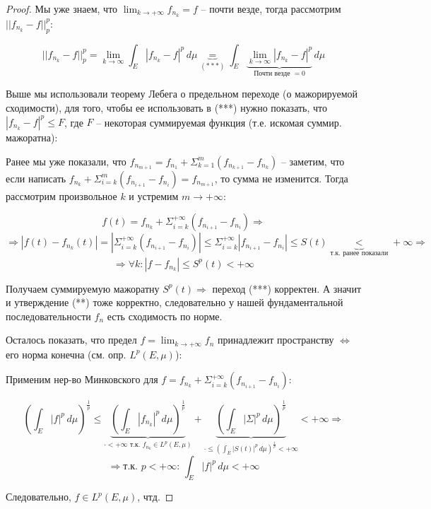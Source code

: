 \begin{proof}
    Мы уже знаем, что $\lim_{k\rightarrow +\infty} f_{n_k} = f$ -- почти везде, тогда рассмотрим $|| f_{n_k} - f ||^p_p$:

    $$|| f_{n_k} - f ||^p_p = \lim_{k\rightarrow \infty} \int_{E} |f_{n_k} - f|^p \,d\mu \underbrace{=}_{(***)} \int_{E} \underbrace{\lim_{k\rightarrow \infty} |f_{n_k}-f|^p}_{\text{Почти везде $= 0$}}\, d\mu$$

    Выше мы использовали теорему Лебега о предельном переходе (о мажорируемой сходимости), для того, чтобы ее использовать в (***) нужно показать, что $|f_{n_k} - f|^p \leq F$, где $F$ -- некоторая суммируемая функция (т.е. искомая суммир. мажоратна):

    Ранее мы уже показали, что $f_{n_{m+1}} = f_{n_1} + \Sigma_{k=1}^{m} (f_{n_{k+1}} - f_{n_k})$ -- заметим, что если написать $f_{n_k} + \Sigma_{i=k}^{m} (f_{n_{i+1}} - f_{n_i}) = f_{n_{m+1}}$, то сумма не изменится. Тогда рассмотрим произвольное $k$ и устремим $m \rightarrow +\infty$:

    $$ f(t) = f_{n_k} + \Sigma_{i=k}^{+\infty} (f_{n_{i+1}} - f_{n_i}) \Rightarrow $$
    $$ \Rightarrow |f(t) - f_{n_k}(t)| = \left|\Sigma_{i=k}^{+\infty} (f_{n_{i+1}} - f_{n_i})\right| \leq \Sigma_{i=k}^{+\infty} |f_{n_{i+1}} - f_{n_i}| \leq S(t) \underbrace{<}_{\text{т.к. ранее показали}} +\infty \Rightarrow$$
    $$ \Rightarrow \forall k: |f - f_{n_k}| \leq S^p(t) < +\infty $$

    Получаем суммируемую мажоратну $S^p(t) \Rightarrow$ переход (***) корректен. А значит и утверждение (**) тоже корректно, следовательно у нашей фундаментальной последовательности $f_n$ есть сходимость по норме. \newline

    Осталось показать, что предел $f = \lim_{k\rightarrow +\infty} f_n$ принадлежит пространству $\Leftrightarrow$ его норма конечна (см. опр. $L^p (E, \mu)$):

    Применим нер-во Минковского для $f = f_{n_k} + \Sigma_{i=k}^{+\infty} (f_{n_{i+1}} - f_{n_i})$:

    $$ \left(\int_{E} |f|^p \, d\mu\right)^{\frac{1}{p}} \leq \underbrace{\left(\int_{E} |f_{n_k}|^p \, d\mu\right)^{\frac{1}{p}}}_{\cdot < +\infty \text{ т.к. $f_{n_k} \in L^p(E, \mu)$}} + \underbrace{\left(\int_{E} |\Sigma|^p \, d\mu\right)^{\frac{1}{p}}}_{\cdot \leq \left(\int_{E} |S(t)|^p \, d\mu\right)^{\frac{1}{p}} < +\infty} < +\infty \Rightarrow$$
    $$ \Rightarrow \text{т.к. $p < +\infty$: } \int_{E} |f|^p \, d\mu < +\infty $$

    Следовательно, $f \in L^p(E, \mu)$, чтд.


\end{proof}

